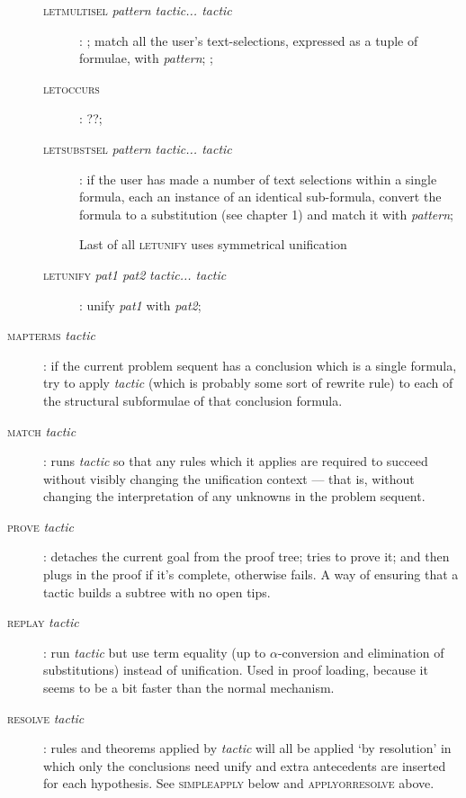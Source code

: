 \begin{description}
\begin{description}
\item [\textsc{letmultisel} \textit{pattern tactic... tactic}]: ; match all the user's text-selections, expressed as a tuple of formulae, with \textit{pattern}; ;
\item [\textsc{letoccurs}]: ??;

\item [\textsc{letsubstsel} \textit{pattern tactic... tactic}]: if the user has made a number of text selections within a single formula, each an instance of an identical sub-formula, convert the formula to a substitution (see chapter 1) and match it with \textit{pattern}; 

\end{description}

\begin{description}
\item[] Last of all \textsc{letunify} uses symmetrical unification
\item [\textsc{letunify} \textit{pat1 pat2} \textit{tactic... tactic}]: unify \textit{pat1} with \textit{pat2};
\end{description}


\item [\textsc{mapterms} \textit{tactic}]: if the current problem sequent has a conclusion which is a single formula, try to apply \textit{tactic} (which is probably some sort of rewrite rule) to each of the structural subformulae of that conclusion formula.

\item [\textsc{match} \textit{tactic}]: runs \textit{tactic} so that any rules which it applies are required to succeed without visibly changing the unification context --- that is, without changing the interpretation of any unknowns in the problem sequent.

\item [\textsc{prove} \textit{tactic}]: detaches the current goal from the proof tree; tries to prove it; and then plugs in the proof if it's complete, otherwise fails. A way of ensuring that a tactic builds a subtree with no open tips.

\item [\textsc{replay} \textit{tactic}]: run \textit{tactic} but use term equality (up to \ensuremath{\alpha}-conversion and elimination of substitutions) instead of unification. Used in proof loading, because it seems to be a bit faster than the normal mechanism.

\item [\textsc{resolve} \textit{tactic}]: rules and theorems applied by \textit{tactic} will all be applied `by resolution' in which only the conclusions need unify and extra antecedents are inserted for each hypothesis. See \textsc{simpleapply} below and \textsc{applyorresolve} above.



\end{description}
